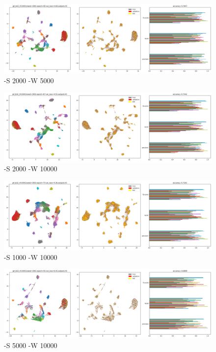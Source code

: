 \documentclass{article}
\begin{document}
\begin{figure}[h!]
  \includegraphics[width=\linewidth]{new_journal/figures/experiments/roznet/medium/S_W/2000_5000.png}
  \caption{-S 2000 -W 5000}
\end{figure}

\begin{figure}[h!]
  \includegraphics[width=\linewidth]{new_journal/figures/experiments/roznet/medium/S_W/2000_10000.png}
  \caption{-S 2000 -W 10000}
\end{figure}

\begin{figure}[h!]
  \includegraphics[width=\linewidth]{new_journal/figures/experiments/roznet/medium/S_W/1000_10000.png}
  \caption{-S 1000 -W 10000}
\end{figure}

\begin{figure}[h!]
  \includegraphics[width=\linewidth]{new_journal/figures/experiments/roznet/medium/S_W/5000_10000.png}
  \caption{-S 5000 -W 10000}
\end{figure}
\end{document}
